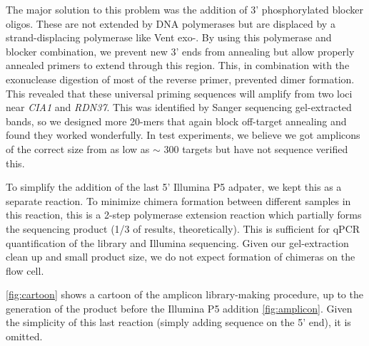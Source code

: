 The major solution to this problem was the addition of 3' phosphorylated
blocker oligos. These are not extended by DNA polymerases but are
displaced by a strand-displacing polymerase like Vent exo-. By using
this polymerase and blocker combination, we prevent new 3' ends from annealing
but allow properly annealed primers to extend through this region. This,
in combination with the exonuclease digestion of most of the reverse
primer, prevented dimer formation. This revealed that these universal
priming sequences will amplify from two loci near \emph{CIA1} and
\emph{RDN37}. This was identified by Sanger sequencing gel-extracted
bands, so we designed more 20-mers that again block off-target annealing
and found they worked wonderfully. In test experiments, we believe we
got amplicons of the correct size from as low as \(\sim\) 300 targets
but have not sequence verified this.

To simplify the addition of the last 5' Illumina P5 adpater, we kept
this as a separate reaction. To minimize chimera formation between
different samples in this reaction, this is a 2-step polymerase
extension reaction which partially forms the sequencing product (1/3 of
results, theoretically). This is sufficient for qPCR quantification of
the library and Illumina sequencing. Given our gel-extraction clean up
and small product size, we do not expect formation of chimeras on the
flow cell.

\autoref{fig:cartoon} shows a cartoon of
the amplicon library-making procedure, up to the generation of the
product before the Illumina P5 addition \autoref{fig:amplicon}. 
Given the simplicity of this
last reaction (simply adding sequence on the 5' end), it is omitted.


%  


